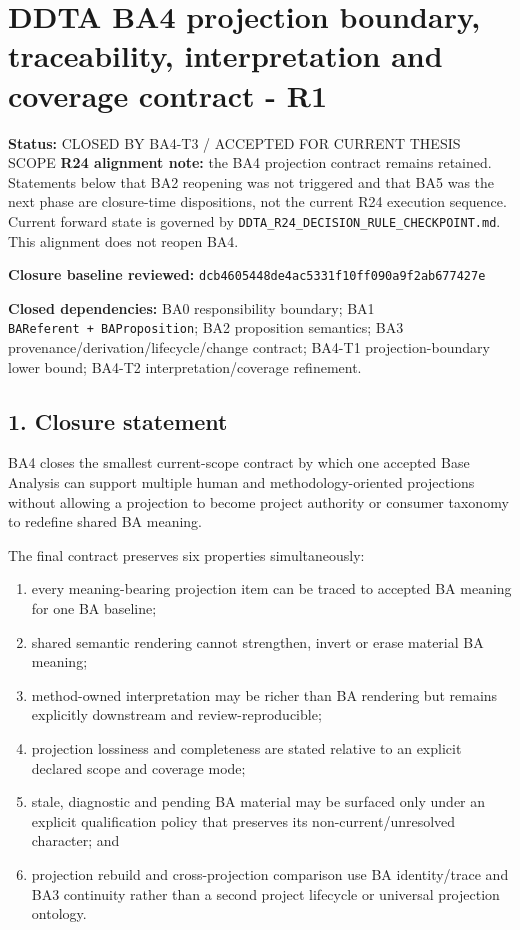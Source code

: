 \documentclass[
  11pt,
  a4paper,
]{article}
\author{}
\date{}
\providecommand{\tightlist}{%
  \setlength{\itemsep}{0pt}\setlength{\parskip}{0pt}}
\begin{document}
\section{DDTA BA4 projection boundary, traceability, interpretation and
coverage contract -
R1}\label{ddta-ba4-projection-boundary-traceability-interpretation-and-coverage-contract---r1}

\textbf{Status:} CLOSED BY BA4-T3 / ACCEPTED FOR CURRENT THESIS SCOPE
\textbf{R24 alignment note:} the BA4 projection contract remains retained. Statements below that BA2 reopening was not triggered and that BA5 was the next phase are closure-time dispositions, not the current R24 execution sequence. Current forward state is governed by \texttt{DDTA\_R24\_DECISION\_RULE\_CHECKPOINT.md}. This alignment does not reopen BA4.


\textbf{Closure baseline reviewed:}
\texttt{dcb4605448de4ac5331f10ff090a9f2ab677427e}

\textbf{Closed dependencies:} BA0 responsibility boundary; BA1
\texttt{BAReferent\ +\ BAProposition}; BA2 proposition semantics; BA3
provenance/derivation/lifecycle/change contract; BA4-T1
projection-boundary lower bound; BA4-T2 interpretation/coverage
refinement.

\subsection{1. Closure statement}\label{closure-statement}

BA4 closes the smallest current-scope contract by which one accepted
Base Analysis can support multiple human and methodology-oriented
projections without allowing a projection to become project authority or
consumer taxonomy to redefine shared BA meaning.

The final contract preserves six properties simultaneously:

\begin{enumerate}
\def\labelenumi{\arabic{enumi}.}
\tightlist
\item
  every meaning-bearing projection item can be traced to accepted BA
  meaning for one BA baseline;
\item
  shared semantic rendering cannot strengthen, invert or erase material
  BA meaning;
\item
  method-owned interpretation may be richer than BA rendering but
  remains explicitly downstream and review-reproducible;
\item
  projection lossiness and completeness are stated relative to an
  explicit declared scope and coverage mode;
\item
  stale, diagnostic and pending BA material may be surfaced only under
  an explicit qualification policy that preserves its
  non-current/unresolved character; and
\item
  projection rebuild and cross-projection comparison use BA
  identity/trace and BA3 continuity rather than a second project
  lifecycle or universal projection ontology.
\end{enumerate}
\end{document}
